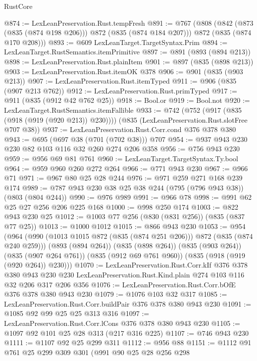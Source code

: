 \begin{lexlean}{RustCore}
\begin{coremodule}
@874 := LexLeanPreservation.Rust.tempFresh
@891 := @767
    (@808
      (@842 (@873 (@835 (@874 @198 @206))) @872 (@835 (@874 @184 @207)))
      @872
      (@835 (@874 @170 @208)))
@893 := @609 LexLeanTarget.TargetSyntax.Prim
@894 := LexLeanTarget.RustSemantics.itemPrimitive
@897 := @891 (@893 (@894 @213))
@898 := LexLeanPreservation.Rust.plainItem
@901 := @897 (@835 (@898 @213))
@903 := LexLeanPreservation.Rust.itemOK @378
@906 := @901 (@835 (@903 @213))
@907 := LexLeanPreservation.Rust.itemTyped
@911 := @906 (@835 (@907 @213 @762))
@912 := LexLeanPreservation.Rust.primTyped
@917 := @911 (@835 (@912 @42 @762 @25))
@918 := Bool.or
@919 := Bool.not
@920 := LexLeanTarget.RustSemantics.itemFallible
@933 := @742
    (@752 (@917 (@835 (@918 (@919 (@920 @213)) @230))))
    (@835 (LexLeanPreservation.Rust.slotFree @707 @38))
@937 := LexLeanPreservation.Rust.Corr.cond @376 @378 @380
@943 := @695 (@697 @38 (@701 (@702 @38))) @707
@954 := @937 @943 @230 @230 @82 @103 @116 @32 @260 @274 @206 @358
@956 := @756 @943 @230
@959 := @956 @69 @81 @761
@960 := LexLeanTarget.TargetSyntax.Ty.bool
@964 := @959 @960 @260 @272 @264
@966 := @771 @943 @230
@967 := @966 @71
@971 := @967 @80 @25 @28 @244
@976 := @971 @259 @271 @168 @239 @174
@989 := @787 @943 @230 @38 @25 @38 @244 (@795 (@796 @943 @38)) (@803 (@804 @244))
@990 := @976 @989
@991 := @966 @78
@998 := @991 @62 @25 @27 @256 @206 @225 @168
@1000 := @998 @250 @174
@1003 := @822 @943 @230 @25
@1012 := @1003 @77 @256 (@830 (@831 @256)) (@835 (@837 @77 @25))
@1013 := @1000 @1012
@1015 := @866 @943 @230
@1053 := @954
    (@964
      (@990 (@1013 @1015 @872 (@835 (@874 @251 @206))) @872 (@835 (@874 @240 @259)))
      (@893 (@894 @264))
      (@835 (@898 @264))
      (@835 (@903 @264))
      (@835 (@907 @264 @761))
      (@835 (@912 @69 @761 @960))
      (@835 (@918 (@919 (@920 @264)) @230)))
@1070 := LexLeanPreservation.Rust.Corr.kIf
    @376
    @378
    @380
    @943
    @230
    @230
    LexLeanPreservation.Rust.Kind.plain
    @274
    @103
    @116
    @32
    @206
    @317
    @206
    @356
@1076 := LexLeanPreservation.Rust.Corr.bOfE @376 @378 @380 @943 @230
@1079 := @1076 @103 @32 @317
@1085 := LexLeanPreservation.Rust.Corr.buildPair @376 @378 @380 @943 @230
@1091 := @1085 @92 @99 @25 @25 @313 @316
@1097 := LexLeanPreservation.Rust.Corr.lCons @376 @378 @380 @943 @230
@1105 := @1097 @92 @101 @25 @28 @313 (@217 @316 @225)
@1107 := @746 @943 @230
@1111 := @1107 @92 @25 @299 @311
@1112 := @956 @88
@1151 := @1112
    @91
    @761
    @25
    @299
    @309
    @301
    (@991
      @90
      @25
      @28
      @256
      @298

\end{coremodule}
\end{lexlean}
